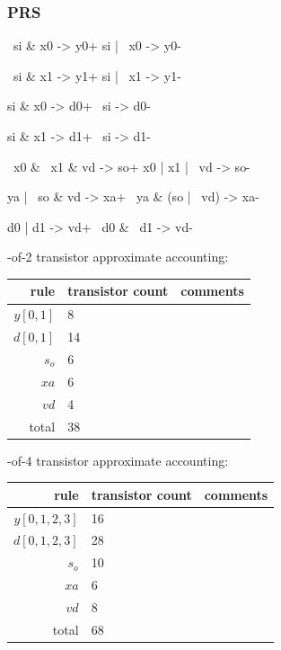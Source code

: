 \documentclass{article}
\begin{document}
\subsubsection*{PRS}

\begin{prs2}
~si & x0 -> y0+
si | ~x0 -> y0-

~si & x1 -> y1+
si | ~x1 -> y1-
\end{prs2}

\begin{prs2}
si & x0 -> d0+
~si -> d0-

si & x1 -> d1+
~si -> d1-
\end{prs2}

\begin{prs2}
~x0 & ~x1 & vd -> so+
x0 | x1 | ~vd -> so-
\end{prs2}

\begin{prs2}
ya | ~so & vd -> xa+
~ya & (so | ~vd) -> xa-
\end{prs2}

\begin{prs2}
d0 | d1 -> vd+
~d0 & ~d1 -> vd-
\end{prs2}

-of-2 transistor approximate accounting:

\begin{center}
    \begin{tabular}{|r|l|l|}
    \hline
    rule & transistor count & comments \\ \hline
    $y[0,1]$ & 8 & \\ \hline
    $d[0,1]$ & 14 & \\ \hline
    $s_o$ & 6 & \\ \hline
    $xa$ & 6 & \\ \hline
    $vd$ & 4 & \\ \hline
    \hline total & 38 & \\ \hline
    \end{tabular}
\end{center}

-of-4 transistor approximate accounting:

\begin{center}
    \begin{tabular}{|r|l|l|}
    \hline
    rule & transistor count & comments \\ \hline
    $y[0,1,2,3]$ & 16 & \\ \hline
    $d[0,1,2,3]$ & 28 & \\ \hline
    $s_o$ & 10 & \\ \hline
    $xa$ & 6 & \\ \hline
    $vd$ & 8 & \\ \hline
    \hline total & 68 & \\ \hline
    \end{tabular}
\end{center}
\end{document}

